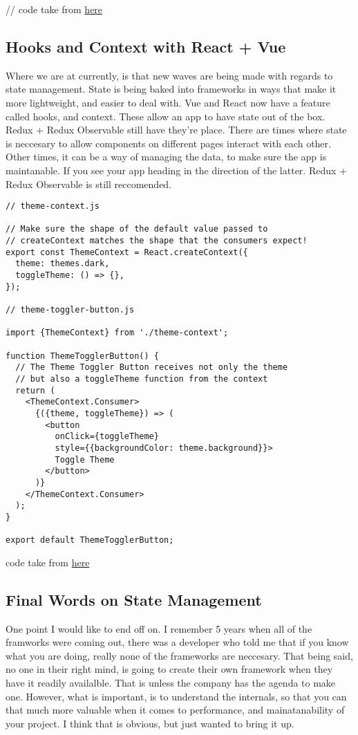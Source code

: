 // code take from \href{https://github.com/CharlieGreenman/angularPixel_illustrator}{here}

\subsection{ Hooks and Context with React + Vue }
Where we are at currently, is that new waves are being made with regards to
state management. State is being baked into frameworks in ways that make it
more lightweight, and easier to deal with. Vue and React now have a feature
called hooks, and context. These allow an app to have state out of the box.
Redux + Redux Observable still have they're place. There are times where state
is neccesary to allow components on different pages interact with each other.
Other times, it can be a way of managing the data, to make sure the app is
maintanable. If you see your app heading in the direction of the latter. Redux +
Redux Observable is still reccomended.

\begin{lstlisting}
// theme-context.js

// Make sure the shape of the default value passed to
// createContext matches the shape that the consumers expect!
export const ThemeContext = React.createContext({
  theme: themes.dark,
  toggleTheme: () => {},
});

// theme-toggler-button.js

import {ThemeContext} from './theme-context';

function ThemeTogglerButton() {
  // The Theme Toggler Button receives not only the theme
  // but also a toggleTheme function from the context
  return (
    <ThemeContext.Consumer>
      {({theme, toggleTheme}) => (
        <button
          onClick={toggleTheme}
          style={{backgroundColor: theme.background}}>
          Toggle Theme
        </button>
      )}
    </ThemeContext.Consumer>
  );
}

export default ThemeTogglerButton;
\end{lstlisting}
code take from \href{https://reactjs.org/docs/context.html}{here}

\subsection{ Final Words on State Management }
One point I would like to end off on. I remember 5 years when all of the
framworks were coming out, there was a developer who told me that if you know
what you are doing, really none of the frameworks are neccesary. That being said,
no one in their right mind, is going to create their own framework when they have
it readily availalble. That is unless the company has the agenda to make one.
However, what is important, is to understand the internals, so that you can
that much more valuable when it comes to performance, and mainatanability of
your project. I think that is obvious, but just wanted to bring it up.
